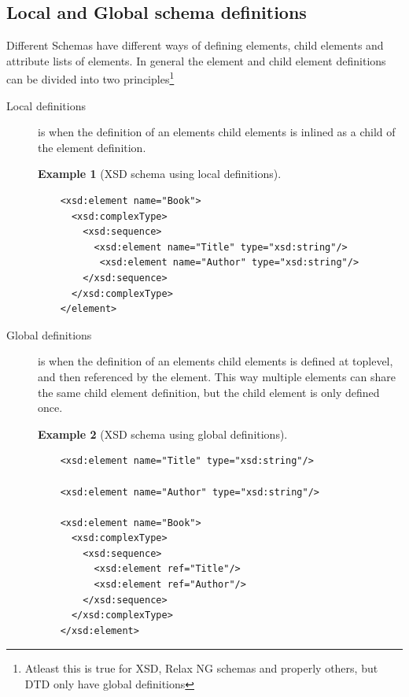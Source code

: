 \documentclass[a4paper, oneside]{memoir}
\theoremstyle{definition}
\newtheorem{example}{Example}
\begin{document}
\subsection{Local and Global schema definitions}
\label{sec:local-global-schema-definitions}
Different Schemas have different ways of defining elements, child elements and
attribute lists of elements. In general the element and child element
definitions can be divided into two principles\footnote{Atleast this is true for
  XSD, Relax NG schemas and properly others, but DTD only have global definitions}

\begin{description}
\item[Local definitions] is when the definition of an elements child elements is
  inlined as a child of the element definition. 

  \begin{example}[XSD schema using local definitions] \ %
\begin{verbatim}
    <xsd:element name="Book"> 
      <xsd:complexType> 
        <xsd:sequence> 
          <xsd:element name="Title" type="xsd:string"/> 
           <xsd:element name="Author" type="xsd:string"/> 
        </xsd:sequence> 
      </xsd:complexType> 
    </element>
\end{verbatim}
  \end{example}

\item[Global definitions] is when the definition of an elements child elements
  is defined at toplevel, and then referenced by the element. This way multiple
  elements can share the same child element definition, but the child element is
  only defined once.

  \begin{example}[XSD schema using global definitions] \ %
\begin{verbatim}
    <xsd:element name="Title" type="xsd:string"/>

    <xsd:element name="Author" type="xsd:string"/>

    <xsd:element name="Book">
      <xsd:complexType> 
        <xsd:sequence> 
          <xsd:element ref="Title"/> 
          <xsd:element ref="Author"/>
        </xsd:sequence> 
      </xsd:complexType> 
    </xsd:element>
\end{verbatim}
  \end{example}

\end{description}
\end{document}
